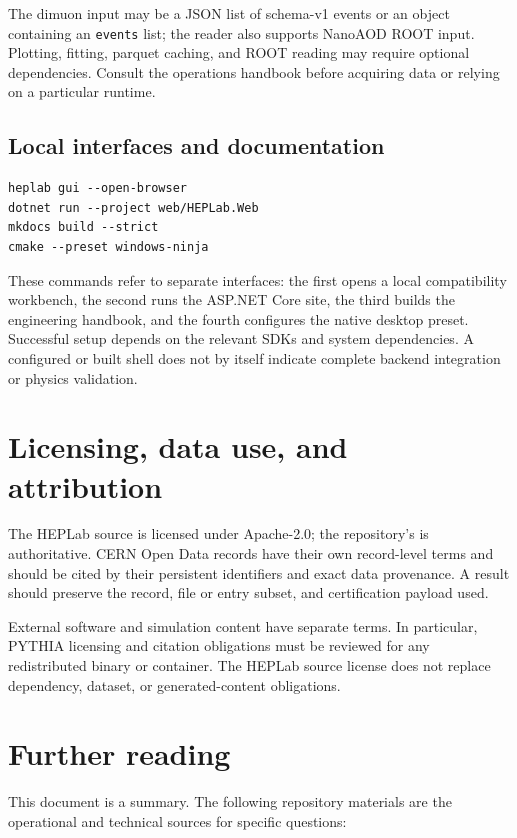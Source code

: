 \documentclass[11pt,a4paper]{article}
\begin{document}
The dimuon input may be a JSON list of schema-v1 events or an object containing
an \texttt{events} list; the reader also supports NanoAOD ROOT input. Plotting,
fitting, parquet caching, and ROOT reading may require optional dependencies.
Consult the operations handbook before acquiring data or relying on a
particular runtime.

\subsection{Local interfaces and documentation}

\begin{lstlisting}
heplab gui --open-browser
dotnet run --project web/HEPLab.Web
mkdocs build --strict
cmake --preset windows-ninja
\end{lstlisting}

These commands refer to separate interfaces: the first opens a local
compatibility workbench, the second runs the ASP.NET Core site, the third
builds the engineering handbook, and the fourth configures the native desktop
preset. Successful setup depends on the relevant SDKs and system dependencies.
A configured or built shell does not by itself indicate complete backend
integration or physics validation.

\section{Licensing, data use, and attribution}

The HEPLab source is licensed under Apache-2.0; the repository's
 is authoritative. CERN Open Data records have their own
record-level terms and should be cited by their persistent identifiers and
exact data provenance. A result should preserve the record, file or entry
subset, and certification payload used.

External software and simulation content have separate terms. In particular,
PYTHIA licensing and citation obligations must be reviewed for any redistributed
binary or container. The HEPLab source license does not replace dependency,
dataset, or generated-content obligations.

\section{Further reading}

This document is a summary. The following repository materials are the
operational and technical sources for specific questions:
\end{document}
